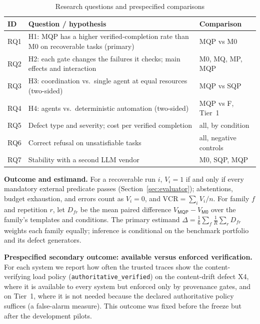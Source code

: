 \documentclass[conference]{IEEEtran}
\newcommand{\vcr}{\mathrm{VCR}}
\newcommand{\sys}[1]{\textsf{#1}}
\begin{document}
\begin{table}[t]
\caption{Research questions and prespecified comparisons}
\label{tab:rq}
\centering\footnotesize
\begin{tabular}{@{}p{}p{}p{}@{}}
\toprule
ID & Question / hypothesis & Comparison \\
\midrule
RQ1 & H1: \sys{MQP} has a higher verified-completion rate than \sys{M0} on recoverable tasks (primary) & \sys{MQP} vs \sys{M0} \\
RQ2 & H2: each gate changes the failures it checks; main effects and interaction & \sys{M0}, \sys{MQ}, \sys{MP}, \sys{MQP} \\
RQ3 & H3: coordination vs.\ single agent at equal resources (two-sided) & \sys{MQP} vs \sys{SQP} \\
RQ4 & H4: agents vs.\ deterministic automation (two-sided) & \sys{MQP} vs \sys{F}, Tier~1 \\
RQ5 & Defect type and severity; cost per verified completion & all, by condition \\
RQ6 & Correct refusal on unsatisfiable tasks & all, negative controls \\
RQ7 & Stability with a second LLM vendor & \sys{M0}, \sys{SQP}, \sys{MQP} \\
\bottomrule
\end{tabular}
\end{table}

\textbf{Outcome and estimand.} For a recoverable run $i$, $V_i=1$ if and only if every mandatory external predicate
passes (Section~\ref{sec:evaluator}); abstentions, budget exhaustion, and errors count as $V_i=0$, and
$\vcr=\sum_i V_i/n$. For family $f$ and repetition $r$, let $D_{fr}$ be the mean paired difference
$V_{\sys{MQP}}-V_{\sys{M0}}$ over the family's templates and conditions. The primary estimand
$\Delta=\frac{1}{6}\sum_f\frac{1}{R}\sum_r D_{fr}$ weights each family equally; inference is conditional on the
benchmark portfolio and its defect generators.

\textbf{Prespecified secondary outcome: available versus enforced verification.} For each system we report how often
the trusted traces show the content-verifying load policy (\texttt{authoritative\_verified}) on the content-drift
defect X4, where it is available to every system but enforced only by provenance gates, and on Tier~1, where it is
not needed because the declared authoritative policy suffices (a false-alarm measure). This outcome was fixed before the freeze but after the development pilots.
\end{document}
